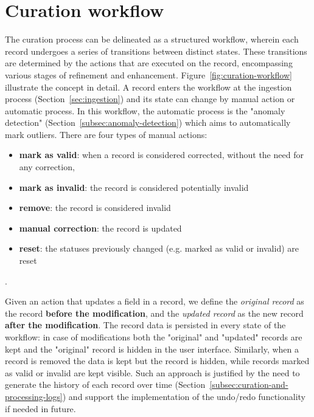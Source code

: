 \documentclass[a4paper]{article}
\begin{document}
\section{Curation workflow}
\label{sec:curation-workflow}

The curation process can be delineated as a structured workflow, wherein each record undergoes a series of transitions between distinct states. 
These transitions are determined by the actions that are executed on the record, encompassing various stages of refinement and enhancement. 
Figure~\ref{fig:curation-workflow} illustrate the concept in detail.
A record enters the workflow at the ingestion process (Section~\ref{sec:ingestion}) and its state can change by manual action or automatic process. 
In this workflow, the automatic process is the "anomaly detection" (Section~\ref{subsec:anomaly-detection}) which aims to automatically mark outliers. 
There are four types of manual actions: 
\begin{itemize}
    \item \textbf{mark as valid}: when a record is considered corrected, without the need for any correction, 
    \item \textbf{mark as invalid}: the record is considered potentially invalid
    \item \textbf{remove}: the record is considered invalid
    \item \textbf{manual correction}: the record is updated 
    \item \textbf{reset}: the statuses previously changed (e.g. marked as valid or invalid) are reset
\end{itemize}.

Given an action that updates a field in a record, we define the \emph{original record} as the record \textbf{before the modification}, and the \emph{updated record} as the new record \textbf{after the modification}. 
The record data is persisted in every state of the workflow: in case of modifications both the "original" and "updated" records are kept and the "original" record is hidden in the user interface.  
Similarly, when a record is removed the data is kept but the record is hidden, while records marked as valid or invalid are kept visible. 
Such an approach is justified by the need to generate the history of each record over time (Section~\ref{subsec:curation-and-processing-logs}) and support the implementation of the undo/redo functionality if needed in future. 
\end{document}
